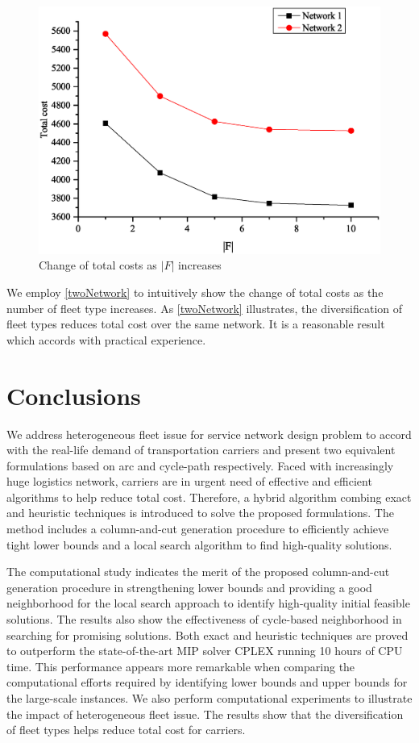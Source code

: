 \documentclass[11pt,nonblindrev,fleqn]{article}
\begin{document}
\begin{figure}[H]
\setlength{\abovecaptionskip}{-5pt}
\setlength{\belowcaptionskip}{-5pt}
\centering
\includegraphics[width=0.7\linewidth]{F7.eps}
\caption{Change of total costs as $|F|$ increases}
\label{twoNetwork}
\end{figure}

We employ \autoref{twoNetwork} to intuitively show the change of total costs as the number of fleet type increases. As \autoref{twoNetwork} illustrates, the diversification of fleet types reduces total cost over the same network. It is a reasonable result which accords with practical experience.

\section{Conclusions}\label{conclusion}
We address heterogeneous fleet issue for service network design problem to accord with the real-life demand of transportation carriers and present two equivalent formulations based on arc and cycle-path respectively. Faced with increasingly huge logistics network, carriers are in urgent need of effective and efficient algorithms to help reduce total cost. Therefore, a hybrid algorithm combing exact and heuristic techniques is introduced to solve the proposed formulations. The method includes a column-and-cut generation procedure to efficiently achieve tight lower bounds and a local search algorithm to find high-quality solutions.

The computational study indicates the merit of the proposed column-and-cut generation procedure in strengthening lower bounds and providing a good neighborhood for the local search approach to identify high-quality initial feasible solutions. The results also show the effectiveness of cycle-based neighborhood in searching for promising solutions. Both exact and heuristic techniques are proved to outperform the state-of-the-art MIP solver CPLEX running 10 hours of CPU time. This performance appears more remarkable when comparing the computational efforts required by identifying lower bounds and upper bounds for the large-scale instances. We also perform computational experiments to illustrate the impact of heterogeneous fleet issue. The results show that the diversification of fleet types helps reduce total cost for carriers.


\end{document}
